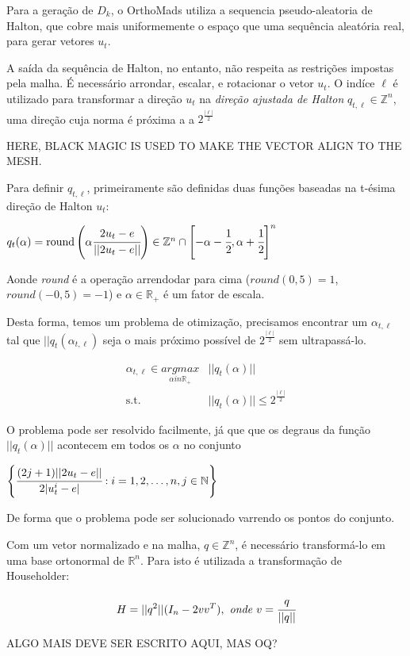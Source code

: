 Para a geração de $D_k$, o OrthoMads utiliza a sequencia pseudo-aleatoria de Halton, que cobre mais uniformemente o espaço que uma sequência aleatória real, para  gerar vetores $u_t$.

A saída da sequência de Halton, no entanto, não respeita as restrições impostas pela malha. É necessário arrondar, escalar, e rotacionar o vetor $u_t$. O indíce $\ell$ é utilizado para transformar a direção $u_t$ na \textit{direção ajustada de Halton} $q_{t,\ell} \in \mathbb{Z}^n$, uma direção cuja norma é próxima a a $2^{\frac{|\ell|}{2}}$

HERE, BLACK MAGIC IS USED TO MAKE THE VECTOR ALIGN TO THE MESH.

Para definir $q_{t,\ell}$, primeiramente são definidas duas funções baseadas na t-ésima direção de Halton $u_t$:

$q_t(\alpha) = \text{round} \left ( \alpha \cfrac{2u_t - e}{||2u_t - e||} \right ) \in \mathbb{Z}^n \cap \left [ -\alpha - \cfrac{1}{2}, \alpha + \cfrac{1}{2}  \right ]^n$

Aonde \textit{round} é a operação arrendodar para cima ($round(0,5)=1$, $round(-0,5) = -1$) e $\alpha \in \mathbb{R}_+$ é um fator de escala. 

Desta forma, temos um problema de otimização, precisamos encontrar um $\alpha_{t,\ell}$ tal que $||q_t(\alpha_{t,\ell})$ seja o mais próximo possível de $2^{\frac{|\ell|}{2}}$ sem ultrapassá-lo.

\begin{align*}
\alpha_{t,\ell} \in \underset{\alpha in \mathbb{R}_+}{\textit{argmax}} & ||q_t(\alpha)|| \\
\text{s.t.} & ||q_t(\alpha)|| \leq 2^{\frac{|\ell|}{2}}
\end{align*}

O problema pode ser resolvido facilmente, já que que os degraus da função $||q_t(\alpha)||$ acontecem em todos os $\alpha$ no conjunto

\begin{center}
$ \left \{ \cfrac{(2j+1)||2u_t - e||}{2|u^i_t - e|} : i = 1,2,\dots,n,j \in \mathbb{N} \right \}$
\end{center}
De forma que o problema pode ser solucionado varrendo os pontos do conjunto.

Com um vetor normalizado e na malha, $q \in \mathbb{Z}^n$, é necessário transformá-lo em uma base ortonormal de $\mathbb{R}^n$. Para isto é utilizada a transformação de Householder:

\begin{equation}
H = ||q^2||(I_n - 2vv^T),\textit{ onde }v = \cfrac{q}{||q||}
\end{equation}

ALGO MAIS DEVE SER ESCRITO AQUI, MAS OQ?



